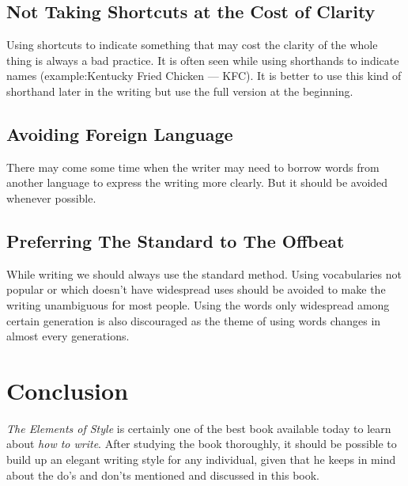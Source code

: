 \documentclass[12pt]{report}
\begin{document}
\section{Not Taking Shortcuts at the Cost of Clarity}
Using shortcuts to indicate something that may cost the clarity of the whole thing is always a bad practice. It is often seen while using shorthands to indicate names (example:Kentucky Fried Chicken --- KFC). It is better to use this kind of shorthand later in the writing but use the full version at the beginning.
\section{Avoiding Foreign Language}
There may come some time when the writer may need to borrow words from another language to express the writing more clearly. But it should be avoided whenever possible. 
\section{Preferring The Standard to The Offbeat}
While writing we should always use the standard method. Using vocabularies not popular or which doesn't have widespread uses should be avoided to make the writing unambiguous for most people. Using the words only widespread among certain generation is also discouraged as the theme of using words changes in almost every generations.

\chapter{Conclusion}
\textit{The Elements of Style} is certainly one of the best book available today to learn about \textit{how to write}. After studying the book thoroughly, it should be possible to build up an elegant writing style for any individual, given that he keeps in mind about the do's and don'ts mentioned and discussed in this book.
\end{document}

